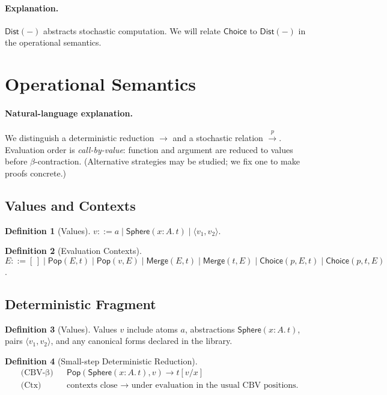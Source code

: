 \documentclass[12pt]{article}
\newcommand{\Subst}[2]{[#1/#2]}
\newcommand{\Sphere}{\mathsf{Sphere}}
\newcommand{\Pop}{\mathsf{Pop}}
\newcommand{\Merge}{\mathsf{Merge}}
\newcommand{\Choice}{\mathsf{Choice}}
\newcommand{\Pair}[2]{\langle #1, #2 \rangle}
\newcommand{\Dist}[1]{\mathsf{Dist}(#1)}
\newcommand{\step}{\rightarrow}
\newcommand{\pstep}[1]{\xrightarrow{#1}}
\theoremstyle{definition}
\newtheorem{definition}{Definition}
\begin{document}
\paragraph{Explanation.}
$\Dist{-}$ abstracts stochastic computation. We will relate $\Choice$ to $\Dist{-}$ in the operational semantics.

\section{Operational Semantics}
\paragraph{Natural-language explanation.}
We distinguish a deterministic reduction $\step$ and a stochastic relation $\pstep{p}$. Evaluation order is \emph{call-by-value}: function and argument are reduced to values before $\beta$-contraction. (Alternative strategies may be studied; we fix one to make proofs concrete.)

\subsection{Values and Contexts}
\begin{definition}[Values]
$v ::= a \mid \Sphere(x\!:\!A.\,t) \mid \Pair{v_1}{v_2}$.
\end{definition}

\begin{definition}[Evaluation Contexts]
$E ::= [\,] \mid \Pop(E,t) \mid \Pop(v,E) \mid \Merge(E,t) \mid \Merge(t,E) \mid \Choice(p,E,t) \mid \Choice(p,t,E)$.
\end{definition}

\subsection{Deterministic Fragment}
\begin{definition}[Values]
Values $v$ include atoms $a$, abstractions $\Sphere(x\!:\!A.\,t)$, pairs $\Pair{v_1}{v_2}$, and any canonical forms declared in the library.
\end{definition}

\begin{definition}[Small-step Deterministic Reduction]
\begin{align*}
&\text{(CBV-β)} && \Pop(\Sphere(x\!:\!A.\,t), v) \step t\Subst{v}{x} \\
&\text{(Ctx)} && \text{contexts close $\step$ under evaluation in the usual CBV positions.}
\end{align*}
\end{definition}
\end{document}
